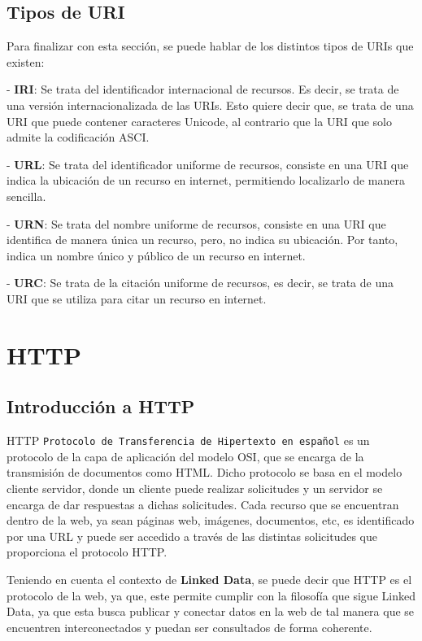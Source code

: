 \documentclass[11pt]{report}
\begin{document}
\section{Tipos de URI}

Para finalizar con esta sección, se puede hablar de los distintos tipos de URIs que existen:

- \textbf{IRI}: Se trata del identificador internacional de recursos. Es decir, se trata de una versión internacionalizada de las URIs. Esto quiere decir que, se trata de una URI que puede contener caracteres Unicode, al contrario que la URI que solo admite la codificación ASCI.

- \textbf{URL}: Se trata del identificador uniforme de recursos, consiste en una URI que indica la ubicación de un recurso en internet, permitiendo localizarlo de manera sencilla.

- \textbf{URN}: Se trata del nombre uniforme de recursos, consiste en una URI que identifica de manera única un recurso, pero, no indica su ubicación. Por tanto, indica un nombre único y público de un recurso en internet.

- \textbf{URC}: Se trata de la citación uniforme de recursos, es decir, se trata de una URI que se utiliza para citar un recurso en internet.

\chapter{HTTP}

\section{Introducción a HTTP}

HTTP \texttt{Protocolo de Transferencia de Hipertexto en español} es un protocolo de la capa de aplicación del modelo OSI, que se encarga de la transmisión de documentos como HTML.  Dicho protocolo se basa en el modelo cliente servidor, donde un cliente puede realizar solicitudes y un servidor se encarga de dar respuestas a dichas solicitudes. Cada recurso que se encuentran dentro de la web, ya sean páginas web, imágenes, documentos, etc, es identificado por una URL y puede ser accedido a través de las distintas solicitudes que proporciona el protocolo HTTP.

Teniendo en cuenta el contexto de \textbf{Linked Data}, se puede decir que HTTP es el protocolo de la web, ya que, este permite cumplir con la filosofía que sigue Linked Data, ya que esta busca publicar y conectar datos en la web de tal manera que se encuentren interconectados y puedan ser consultados de forma coherente.
\end{document}
